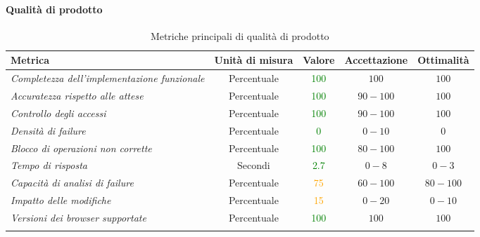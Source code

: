 \paragraph{Qualità di prodotto}
\begin{longtable}{|>{\centering}m{5cm}|c|c|c|c|}
\hline
\textbf{Metrica} & \textbf{Unità di misura} & \textbf{Valore} & \textbf{Accettazione} & \textbf{Ottimalità}\\
\hline
\endhead
\emph{Completezza dell'implementazione funzionale} & {Percentuale} & \textcolor{Green}{100} & $100$ & $100$\\ \hline
\emph{Accuratezza rispetto alle attese} & {Percentuale} & \textcolor{Green}{100} & $90 - 100$ & $100$\\ \hline
\emph{Controllo degli accessi} & {Percentuale} & \textcolor{Green}{100} & $90 - 100$ & $100$\\ \hline
\emph{Densità di failure} & {Percentuale} & \textcolor{Green}{0} & $0 - 10$  & $0$\\ \hline
\emph{Blocco di operazioni non corrette} & {Percentuale} & \textcolor{Green}{100} & $80 - 100$  & $100$\\ \hline
\emph{Tempo di risposta} & {Secondi} & \textcolor{Green}{2.7} & $0 - 8$ & $0 - 3$\\ \hline
\emph{Capacità di analisi di failure} & {Percentuale} & \textcolor{Orange}{75} & $60 - 100$ & $80 - 100$\\ \hline
\emph{Impatto delle modifiche} & {Percentuale} & \textcolor{Orange}{15} & $0 - 20$ & $0 - 10$\\ \hline
\emph{Versioni dei browser supportate} & {Percentuale} & \textcolor{Green}{100} & $100$ & $100$\\ \hline
\caption{Metriche principali di qualità di prodotto}
\end{longtable}